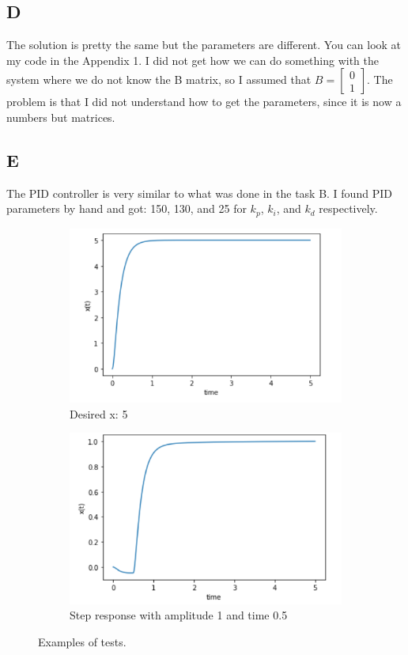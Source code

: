 \documentclass{article}
\begin{document}
\subsection{D}
The solution is pretty the same but the parameters are different. You can look at my code in the Appendix 1. I did not get how we can do something with the system where we do not know the B matrix, so I assumed that $B = \begin{bmatrix}
        0\\ 
        1
    \end{bmatrix}$. The problem is that I did not understand how to get the parameters, since it is now a numbers but matrices.
\subsection{E}
The PID controller is very similar to what was done in the task B. 
I found PID parameters by hand and got: 150, 130, and 25 for $k_p$, $k_i$, and $k_d$ respectively.
\begin{figure}[ht]
   	 \centering
     \begin{subfigure}[b]{0.45\textwidth}
         \centering
         \includegraphics[width=\textwidth]{images/8.png}
         \caption{Desired x: 5}
         \label{fig:test1}
     \end{subfigure}
     \hfill
     \begin{subfigure}[b]{0.45\textwidth}
         \centering
         \includegraphics[width=\textwidth]{images/9.png}
         \caption{Step response with amplitude 1 and time 0.5}
         \label{fig:test2}
     \end{subfigure}
     \caption{Examples of tests.}
\end{figure}
\end{document}
